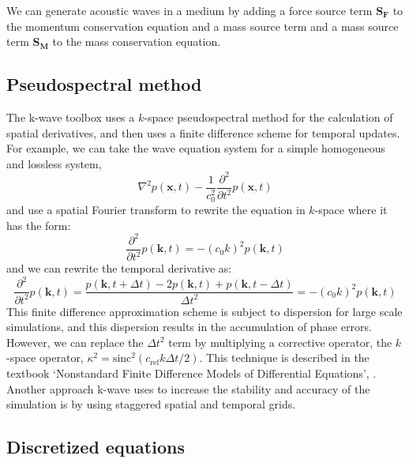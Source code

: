\documentclass[10pt,a4paper]{article}
\begin{document}
We can generate acoustic waves in a medium by adding a force source term \textbf{S$_\textbf{F}$} to the momentum conservation equation and a mass source term and a mass source term \textbf{S$_\textbf{M}$} to the mass conservation equation.

\subsection*{Pseudospectral method}

The k-wave toolbox uses a $k$-space pseudospectral method for the calculation of spatial derivatives, and then uses a finite difference scheme for temporal updates. For example, we can take the wave equation system for a simple homogeneous and lossless system,
\begin{equation}
\nabla^2 p (\textbf{x},t) - \dfrac{1}{c_0^2} \dfrac{\partial^2}{\partial t^2} p (\textbf{x},t)
\end{equation}
and use a spatial Fourier transform to rewrite the equation in $k$-space where it has the form:
\begin{equation}
\frac{\partial^2}{\partial t^2} p(\textbf{k},t) = - (c_0 k)^2 p(\textbf{k},t)
\end{equation}
and we can rewrite the temporal derivative as:
\begin{equation}
\frac{\partial^2}{\partial t^2} p(\textbf{k},t) = \dfrac{p(\textbf{k},t+\Delta t) - 2p(\textbf{k},t)+p(\textbf{k}, t-\Delta t)}{\Delta t^2} = - (c_0 k)^2 p(\textbf{k},t)
\end{equation}
This finite difference approximation scheme is subject to dispersion for large scale simulations, and this dispersion results in the accumulation of phase errors. However, we can replace the $\Delta t^2$ term by multiplying a corrective operator, the $k$-space operator, $\kappa^2 = \text{sinc}^2(c_{\text{ref}} k \Delta t/2)$. This technique is described in the textbook `Nonstandard Finite Difference Models of Differential Equations', \cite{mickens1993nonstandard}. Another approach k-wave uses to increase the stability and accuracy of the simulation is by using staggered spatial and temporal grids. 

\subsection*{Discretized equations}
\end{document}
